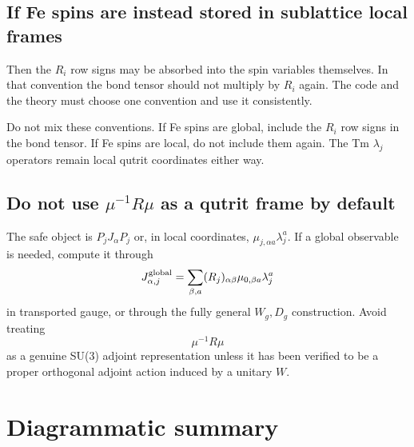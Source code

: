 \documentclass[11pt,a4paper]{article}
\begin{document}
\subsection{If Fe spins are instead stored in sublattice local frames}

Then the $R_i$ row signs may be absorbed into the spin variables themselves.  In that convention the bond tensor should not multiply by $R_i$ again.  The code and the theory must choose one convention and use it consistently.

\begin{warnbox}
Do not mix these conventions.  If Fe spins are global, include the $R_i$ row signs in the bond tensor.  If Fe spins are local, do not include them again.  The Tm $\lambda_j$ operators remain local qutrit coordinates either way.
\end{warnbox}

\subsection{Do not use $\mu^{-1}R\mu$ as a qutrit frame by default}

The safe object is $P_jJ_\alpha P_j$ or, in local coordinates, $\mu_{j,\alpha a}\lambda_j^a$.  If a global observable is needed, compute it through
\begin{equation}
  J_{\alpha,j}^{\rm global}=\sum_{\beta,a}(R_j)_{\alpha\beta}\mu_{0,\beta a}\lambda_j^a
\end{equation}
in transported gauge, or through the fully general $W_g,D_g$ construction.  Avoid treating
\begin{equation}
  \mu^{-1}R\mu
\end{equation}
as a genuine SU(3) adjoint representation unless it has been verified to be a proper orthogonal adjoint action induced by a unitary $W$.

\section{Diagrammatic summary}
\end{document}
